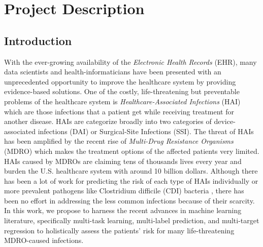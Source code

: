 \section{Project Description}
\subsection{Introduction}
With the ever-growing availability of the \emph{Electronic Health Records} (EHR), many data scientists and health-informaticians have been presented with an unprecedented opportunity to improve the healthcare system by providing evidence-based solutions.  One of the costly, life-threatening but preventable problems of the healthcare system is \emph{Healthcare-Associated Infections} (HAI) which are those infections that a patient get while receiving treatment for another disease. HAIs are categorize broadly into two categories of device-associated infections (DAI) or Surgical-Site Infections (SSI). The threat of HAIs has been amplified by the recent rise of \emph{Multi-Drug Resistance Organisms} (MDRO) which makes the treatment options of the affected patients very limited. HAIs caused by MDROs are claiming tens of thousands lives every year and burden the U.S. healthcare system with around 10 billion dollars. Although there has been a lot of work for predicting the risk of each type of HAIs individually  \cite{mu2011improving, de2006surgical, friedman2007alternative, chiang2014risk, wylie2010risk, noaman2017improving, schoonover2017accurately, herc2017model, parreco2018predicting, grana2015detection, tambyah2004catheter, siddiq2012new, froon1998prediction, larsson2017risk, lisboa2008ventilator, kruger2011prognosis, mirsaeidi2009predicting} or more prevalent pathogens like Clostridium difficile (CDI) bacteria \cite{wiens2014learning, sen2017crest, oh2018generalizable, labarbera2015prediction, dubberke2011development, kuntz2016predicting}, there has been no effort in addressing the less common infections because of their scarcity. In this work, we propose to harness the recent advances in machine learning literature, specifically multi-task learning, multi-label prediction, and multi-target regression to holistically assess the patients' risk for many life-threatening MDRO-caused infections.


